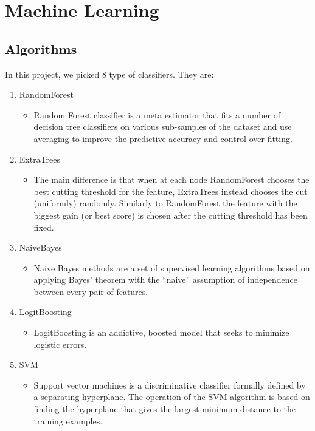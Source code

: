 \chapter{Machine Learning}

\section{Algorithms}
In this project, we picked 8 type of classifiers. They are:
\begin{enumerate}
    \item RandomForest
        \begin{itemize}
            \item Random Forest classifier is a meta estimator that fits a number of decision tree classifiers on various sub-samples of the dataset and use averaging to improve the predictive accuracy and control over-fitting.
        \end{itemize}
    \item ExtraTrees
        \begin{itemize}
            \item  The main difference is that when at each node RandomForest chooses the best cutting threshold for the feature, ExtraTrees instead chooses the cut (uniformly) randomly. Similarly to RandomForest the feature with the biggest gain (or best score) is chosen after the cutting threshold has been fixed.
        \end{itemize}
    \item NaiveBayes
        \begin{itemize}
            \item Naive Bayes methods are a set of supervised learning algorithms based on applying Bayes’ theorem with the “naive” assumption of independence between every pair of features.
        \end{itemize}
    \item LogitBoosting
        \begin{itemize}
            \item LogitBoosting is an addictive, boosted model that seeks to minimize logistic errors.
        \end{itemize}
    \item SVM
        \begin{itemize}
            \item Support vector machines is a discriminative classifier formally defined by a separating hyperplane. The operation of the SVM algorithm is based on finding the hyperplane that gives the largest minimum distance to the training examples.

\end{itemize}
\end{enumerate}
